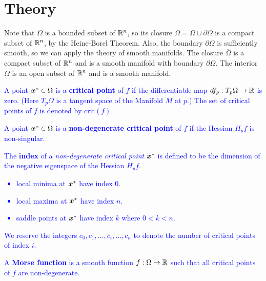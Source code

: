 \documentclass[10pt]{article}
\begin{document}
\section{Theory}
    Note that $\Omega$ is a bounded subset of $\mathbb{R}^n$, so its closure
    $\overline{\Omega} = \Omega \cup \partial \Omega$ is a compact subset
    of $\mathbb{R}^n$, by the Heine-Borel Theorem.
    Also, the boundary $\partial \Omega$ is sufficiently smooth,
    so we can apply the theory of smooth manifolds.
    The closure $\overline{\Omega}$ is a compact subset of $\mathbb{R}^n$ and
    is a smooth manifold with boundary $\partial \Omega$.
    The interior $\Omega$ is an open subset of $\mathbb{R}^n$ and is a smooth manifold.


\begin{definition}
    \textcolor{blue}{
        A point $\bm{x}^* \in \Omega$ is a \textbf{critical point} of $f$ if the
        differentiable map $df_p: T_p \Omega \rightarrow \mathbb{R}$ is zero. (Here
        $T_p \Omega$ is a tangent space of the Manifold $M$ at $p$.) 
        The set of critical points of $f$ is denoted by $\text{crit}(f)$.
    }
\end{definition}

\begin{definition}
    \textcolor{blue}{
        A point $\bm{x}^* \in \Omega$ is a \textbf{non-degenerate critical point} of $f$ if
        the Hessian $H_p f$ is non-singular.
    }
\end{definition}

\begin{definition}
    \textcolor{blue}{
        The \textbf{index} of a \emph{non-degenerate critical point} $\bm{x}^*$ is defined to be
        the dimension of the negative eigenspace of the Hessian $H_p f$.
        \begin{itemize}
            \item local minima at $\bm{x}^*$ have index $0$.
            \item local maxima at $\bm{x}^*$ have index $n$.
            \item saddle points at $\bm{x}^*$ have index $k$ where $0 < k < n$.
        \end{itemize}
        We reserve the integers $c_0, c_1, \dots, c_i, \dots, c_n$ to denote the number of
        critical points of index $i$.
    }
\end{definition}

\begin{definition}
    \textcolor{blue}{
        A \textbf{Morse function} is a smooth function $f : \Omega \rightarrow \mathbb{R}$ such that
        all critical points of $f$ are non-degenerate.
    }
\end{definition}
\end{document}
